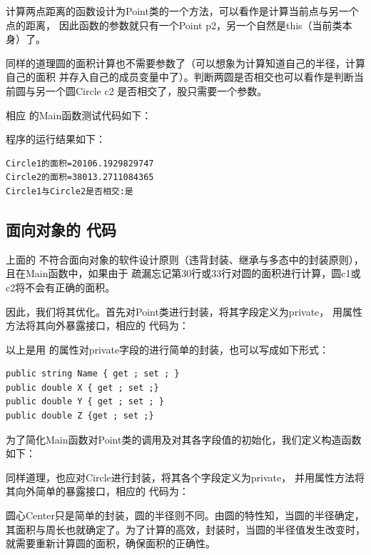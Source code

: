 计算两点距离的函数设计为Point类的一个方法，可以看作是计算当前点与另一个点的距离，
因此函数的参数就只有一个Point p2，另一个自然是this（当前类本身）了。

同样的道理圆的面积计算也不需要参数了（可以想象为计算知道自己的半径，计算自己的面积
并存入自己的成员变量中了）。判断两圆是否相交也可以看作是判断当前圆与另一个圆Circle c2
是否相交了，股只需要一个参数。

相应 \cs 的Main函数测试代码如下：



程序的运行结果如下：
\begin{verbatim}
Circle1的面积=20106.1929829747
Circle2的面积=38013.2711084365
Circle1与Circle2是否相交:是
\end{verbatim}

\subsection{面向对象的 \cs 代码}
上面的 \cs 不符合面向对象的软件设计原则（违背封装、继承与多态中的封装原则），且在Main函数中，如果由于
疏漏忘记第30行或33行对圆的面积进行计算，圆c1或c2将不会有正确的面积。

因此，我们将其优化。首先对Point类进行封装，将其字段定义为private，
用属性方法将其向外暴露接口，相应的 \cs 代码为：



以上是用 \cs 的属性对private字段的进行简单的封装，也可以写成如下形式：
\begin{lstlisting}
public string Name { get ; set ; }
public double X { get ; set ;}
public double Y { get ; set ; }
public double Z {get ; set ;}
\end{lstlisting}

为了简化Main函数对Point类的调用及对其各字段值的初始化，我们定义构造函数如下：


同样道理，也应对Circle进行封装，将其各个字段定义为private，
并用属性方法将其向外简单的暴露接口，相应的 \cs 代码为：



圆心Center只是简单的封装，圆的半径则不同。由圆的特性知，当圆的半径确定，
其面积与周长也就确定了。为了计算的高效，封装时，当圆的半径值发生改变时，
就需要重新计算圆的面积，确保面积的正确性。


